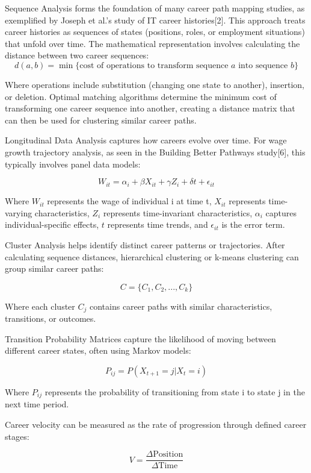 \documentclass{article}
\begin{document}
Sequence Analysis forms the foundation of many career path mapping studies, as exemplified by Joseph et al.'s study of IT career histories[2]. This approach treats career histories as sequences of states (positions, roles, or employment situations) that unfold over time. The mathematical representation involves calculating the distance between two career sequences:
\[ d(a, b) = \min \{\text{cost of operations to transform sequence } a \text{ into sequence } b\} \]

Where operations include substitution (changing one state to another), insertion, or deletion. Optimal matching algorithms determine the minimum cost of transforming one career sequence into another, creating a distance matrix that can then be used for clustering similar career paths.

Longitudinal Data Analysis captures how careers evolve over time. For wage growth trajectory analysis, as seen in the Building Better Pathways study[6], this typically involves panel data models:

\[ W_{it} = \alpha_i + \beta X_{it} + \gamma Z_i + \delta t + \epsilon_{it} \]

Where \(W_{it}\) represents the wage of individual i at time t, \(X_{it}\) represents time-varying characteristics, \(Z_i\) represents time-invariant characteristics, \(\alpha_i\) captures individual-specific effects, \(t\) represents time trends, and \(\epsilon_{it}\) is the error term.

Cluster Analysis helps identify distinct career patterns or trajectories. After calculating sequence distances, hierarchical clustering or k-means clustering can group similar career paths:

\[ C = \{C_1, C_2, ..., C_k\} \]

Where each cluster \(C_j\) contains career paths with similar characteristics, transitions, or outcomes.

Transition Probability Matrices capture the likelihood of moving between different career states, often using Markov models:

\[ P_{ij} = P(X_{t+1} = j | X_t = i) \]

Where \(P_{ij}\) represents the probability of transitioning from state i to state j in the next time period.

Career velocity can be measured as the rate of progression through defined career stages:

\[ V = \frac{\Delta \text{Position}}{\Delta \text{Time}} \]
\end{document}
